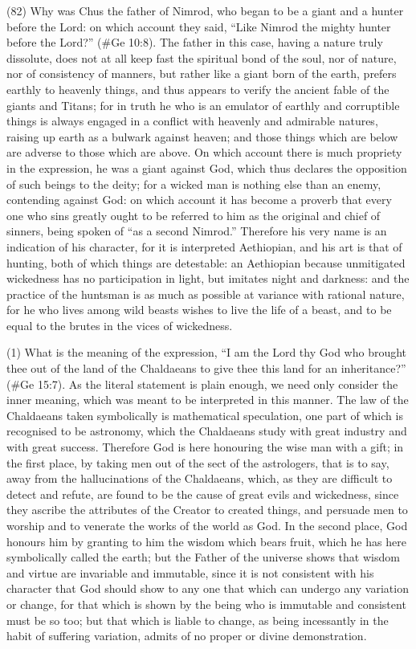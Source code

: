 (82) Why was Chus the father of Nimrod, who began to be a giant and a hunter before the Lord: on
which account they said, ``Like Nimrod the mighty hunter before the Lord?'' (\#Ge 10:8). The
father in this case, having a nature truly dissolute, does not at all keep fast the spiritual bond of the
soul, nor of nature, nor of consistency of manners, but rather like a giant born of the earth, prefers
earthly to heavenly things, and thus appears to verify the ancient fable of the giants and Titans; for
in truth he who is an emulator of earthly and corruptible things is always engaged in a conflict with
heavenly and admirable natures, raising up earth as a bulwark against heaven; and those things
which are below are adverse to those which are above. On which account there is much propriety
in the expression, he was a giant against God, which thus declares the opposition of such beings
to the deity; for a wicked man is nothing else than an enemy, contending against God: on which
account it has become a proverb that every one who sins greatly ought to be referred to him as the
original and chief of sinners, being spoken of ``as a second Nimrod.'' Therefore his very name is
an indication of his character, for it is interpreted Aethiopian, and his art is that of hunting, both of
which things are detestable: an Aethiopian because unmitigated wickedness has no participation in
light, but imitates night and darkness: and the practice of the huntsman is as much as possible at
variance with rational nature, for he who lives among wild beasts wishes to live the life of a beast,
and to be equal to the brutes in the vices of wickedness.


(1) What is the meaning of the expression, ``I am the Lord thy God who brought thee out of the land
of the Chaldaeans to give thee this land for an inheritance?'' (\#Ge 15:7). As the literal
statement is plain enough, we need only consider the inner meaning, which was meant to be
interpreted in this manner. The law of the Chaldaeans taken symbolically is mathematical
speculation, one part of which is recognised to be astronomy, which the Chaldaeans study with
great industry and with great success. Therefore God is here honouring the wise man with a gift; in
the first place, by taking men out of the sect of the astrologers, that is to say, away from the
hallucinations of the Chaldaeans, which, as they are difficult to detect and refute, are found to be
the cause of great evils and wickedness, since they ascribe the attributes of the Creator to
created things, and persuade men to worship and to venerate the works of the world as God. In the
second place, God honours him by granting to him the wisdom which bears fruit, which he has here
symbolically called the earth; but the Father of the universe shows that wisdom and virtue are
invariable and immutable, since it is not consistent with his character that God should show to any
one that which can undergo any variation or change, for that which is shown by the being who is
immutable and consistent must be so too; but that which is liable to change, as being incessantly in
the habit of suffering variation, admits of no proper or divine demonstration.

